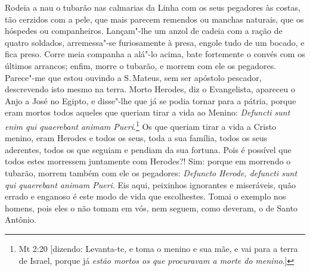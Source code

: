 Rodeia a nau o tubarão nas calmarias da Linha com os seus pegadores às
costas, tão cerzidos com a pele, que mais parecem remendos ou manchas
naturais, que os hóspedes ou companheiros. Lançam"-lhe um anzol de cadeia
com a ração de quatro soldados, arremessa"-se furiosamente à presa,
engole tudo de um bocado, e fica preso. Corre meia companha a alá"-lo
acima, bate fortemente o convés com os últimos arrancos; enfim, morre o
tubarão, e morrem com ele os pegadores.
Parece"-me que estou ouvindo a S.\,Mateus, sem ser apóstolo pescador,
descrevendo isto mesmo na terra. Morto Herodes, diz o Evangelista,
apareceu o Anjo a José no Egipto, e disse"-lhe que já se podia tornar
para a pátria, porque eram mortos todos aqueles que queriam tirar a
vida ao Menino: \emph{Defuncti sunt enim qui quaerebant animam Pueri}.\footnote{Mt 2:20 [dizendo: Levanta-te, e toma o menino e sua mãe, e vai para a terra de Israel, porque já
\emph{estão mortos os que procuravam a morte do menino}.]}
Os que queriam tirar a vida a Cristo menino, eram Herodes e todos os
seus, toda a sua família, todos os seus aderentes, todos os que seguiam
e pendiam da sua fortuna. Pois é possível que todos estes morressem
juntamente com Herodes?! Sim: porque em morrendo o tubarão, morrem
também com ele os pegadores: \emph{Defuncto Herode, defuncti sunt qui
quaerebant animam Pueri}.
Eis aqui, peixinhos ignorantes e miseráveis, quão errado e enganoso é
este modo de vida que escolhestes. Tomai o exemplo nos homens, pois eles
o não tomam em vós, nem seguem, como deveram, o de Santo Antônio.


